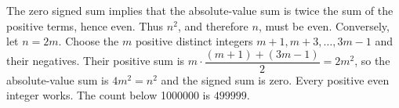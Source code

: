 The zero signed sum implies that the absolute-value sum is twice the sum of the positive terms, hence even. Thus $n^2$, and therefore $n$, must be even. Conversely, let $n=2m$. Choose the $m$ positive distinct integers $m+1,m+3,\ldots,3m-1$ and their negatives. Their positive sum is $m\cdot\dfrac{(m+1)+(3m-1)}{2}=2m^2$, so the absolute-value sum is $4m^2=n^2$ and the signed sum is zero. Every positive even integer works. The count below 1000000 is $\boxed{499999}$.
